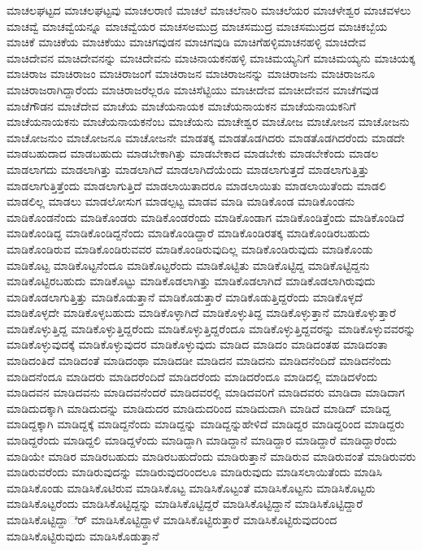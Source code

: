 {ಮಾಚಲಘಟ್ಟದ
ಮಾಚಲಘಟ್ಟವು
ಮಾಚಲರಾಣಿ
ಮಾಚಲೆ
ಮಾಚಲೆನಾರಿ
ಮಾಚಲೆಯರ
ಮಾಚಳೇಶ್ವರ
ಮಾಚವಳಲು
ಮಾಚವ್ವೆ
ಮಾಚವ್ವೆಯನ್ನೂ
ಮಾಚವ್ವೆಯರ
ಮಾಚಸಅಮುದ್ರ
ಮಾಚಸಮುದ್ರ
ಮಾಚಸಮುದ್ರದ
ಮಾಚಿಕಬ್ಬೆಯ
ಮಾಚಿಕೆ
ಮಾಚಿಕೆಯ
ಮಾಚಿಕೆಯು
ಮಾಚಿಗವುಡನ
ಮಾಚಿಗವುಡಿ
ಮಾಚಿಗೆಹಳ್ಳಿಮಾಚನಹಳ್ಳಿ
ಮಾಚಿದೇವ
ಮಾಚಿದೇವನ
ಮಾಚಿದೇವನನ್ನು
ಮಾಚಿದೇವನು
ಮಾಚಿನಾಯಕನಹಳ್ಳಿ
ಮಾಚಿಮಯ್ಯನಿಗೆ
ಮಾಚಿಮಯ್ಯನು
ಮಾಚಿಯಕ್ಕ
ಮಾಚಿರಾಜ
ಮಾಚಿರಾಜಂ
ಮಾಚಿರಾಜಂಗೆ
ಮಾಚಿರಾಜನ
ಮಾಚಿರಾಜನನ್ನು
ಮಾಚಿರಾಜನು
ಮಾಚಿರಾಜನೂ
ಮಾಚಿರಾಜರಾಗಿದ್ದಾರೆಂದು
ಮಾಚಿರಾಜರೆಲ್ಲರೂ
ಮಾಚಿಸೆಟ್ಟಿಯು
ಮಾಚೀದೇವ
ಮಾಚೀದೇವನ
ಮಾಚೆಗವುಡ
ಮಾಚೆಗೌಡನ
ಮಾಚೆದೇವ
ಮಾಚೆಯ
ಮಾಚೆಯನಾಯಕ
ಮಾಚೆಯನಾಯಕನ
ಮಾಚೆಯನಾಯಕನಿಗೆ
ಮಾಚೆಯನಾಯಕನು
ಮಾಚೆಯನಾಯಕನೆಂಬ
ಮಾಚೆಯನು
ಮಾಚೇಶ್ವರ
ಮಾಚೋಜ
ಮಾಚೋಜನ
ಮಾಚೋಜನು
ಮಾಚೋಜನುಂ
ಮಾಚೋಜನೂ
ಮಾಚೋಜನೇ
ಮಾಡತಕ್ಕ
ಮಾಡತೊಡಗಿದರು
ಮಾಡತೊಡಗಿದರೆಂದು
ಮಾಡದೇ
ಮಾಡಬಹುದಾದ
ಮಾಡಬಹುದು
ಮಾಡಬೇಕಾಗಿತ್ತು
ಮಾಡಬೇಕಾದ
ಮಾಡಬೇಕು
ಮಾಡಬೇಕೆಂದು
ಮಾಡಲ
ಮಾಡಲಾಗದು
ಮಾಡಲಾಗಿತ್ತು
ಮಾಡಲಾಗಿದೆ
ಮಾಡಲಾಗಿದೆಯೆಂದು
ಮಾಡಲಾಗುತ್ತದೆ
ಮಾಡಲಾಗುತ್ತಿತ್ತು
ಮಾಡಲಾಗುತ್ತಿತ್ತೆಂದು
ಮಾಡಲಾಗುತ್ತಿದೆ
ಮಾಡಲಾಯಿತಾದರೂ
ಮಾಡಲಾಯಿತು
ಮಾಡಲಾಯಿತೆಂದು
ಮಾಡಲಿ
ಮಾಡಲಿಲ್ಲ
ಮಾಡಲು
ಮಾಡಲೋಸುಗ
ಮಾಡಲ್ಪಟ್ಟ
ಮಾಡವ
ಮಾಡಿ
ಮಾಡಿಕೊಂಡ
ಮಾಡಿಕೊಂಡನು
ಮಾಡಿಕೊಂಡನೆಂದು
ಮಾಡಿಕೊಂಡರು
ಮಾಡಿಕೊಂಡರೆಂದು
ಮಾಡಿಕೊಂಡಾಗ
ಮಾಡಿಕೊಂಡಿತ್ತೆಂದು
ಮಾಡಿಕೊಂಡಿದೆ
ಮಾಡಿಕೊಂಡಿದ್ದ
ಮಾಡಿಕೊಂಡಿದ್ದನೆಂದು
ಮಾಡಿಕೊಂಡಿದ್ದಾರೆ
ಮಾಡಿಕೊಂಡಿರತಕ್ಕ
ಮಾಡಿಕೊಂಡಿರಬಹುದು
ಮಾಡಿಕೊಂಡಿರುವ
ಮಾಡಿಕೊಂಡಿರುವವರ
ಮಾಡಿಕೊಂಡಿರುವುದಿಲ್ಲ
ಮಾಡಿಕೊಂಡಿರುವುದು
ಮಾಡಿಕೊಂಡು
ಮಾಡಿಕೊಟ್ಟ
ಮಾಡಿಕೊಟ್ಟನೆಂದೂ
ಮಾಡಿಕೊಟ್ಟರೆಂದು
ಮಾಡಿಕೊಟ್ಟಿತು
ಮಾಡಿಕೊಟ್ಟಿದ್ದ
ಮಾಡಿಕೊಟ್ಟಿದ್ದನು
ಮಾಡಿಕೊಟ್ಟಿರಬಹುದು
ಮಾಡಿಕೊಟ್ಟು
ಮಾಡಿಕೊಡಲಾಗಿತ್ತು
ಮಾಡಿಕೊಡಲಾಗಿದೆ
ಮಾಡಿಕೊಡಲಾಗಿರುವುದು
ಮಾಡಿಕೊಡಲಾಗುತ್ತಿತ್ತು
ಮಾಡಿಕೊಡುತ್ತಾನೆ
ಮಾಡಿಕೊಡುತ್ತಾರೆ
ಮಾಡಿಕೊಡುತ್ತಿದ್ದರೆಂದು
ಮಾಡಿಕೊಳ್ಳದೆ
ಮಾಡಿಕೊಳ್ಳದೇ
ಮಾಡಿಕೊಳ್ಳಬಹುದು
ಮಾಡಿಕೊಳ್ಳಾಗಿದೆ
ಮಾಡಿಕೊಳ್ಳುತಿದ್ದ
ಮಾಡಿಕೊಳ್ಳುತ್ತಾನೆ
ಮಾಡಿಕೊಳ್ಳುತ್ತಾರೆ
ಮಾಡಿಕೊಳ್ಳುತ್ತಿದ್ದ
ಮಾಡಿಕೊಳ್ಳುತ್ತಿದ್ದರೆಂದು
ಮಾಡಿಕೊಳ್ಳುತ್ತಿದ್ದರೆಂದೂ
ಮಾಡಿಕೊಳ್ಳುತ್ತಿದ್ದವರನ್ನು
ಮಾಡಿಕೊಳ್ಳುವವರನ್ನು
ಮಾಡಿಕೊಳ್ಳುವುದಕ್ಕೆ
ಮಾಡಿಕೊಳ್ಳುವುದರ
ಮಾಡಿಕೊಳ್ಳುವುದು
ಮಾಡಿದ
ಮಾಡಿದಂ
ಮಾಡಿದಂತಹ
ಮಾಡಿದಂತಾ
ಮಾಡಿದಂತಿದೆ
ಮಾಡಿದಂತೆ
ಮಾಡಿದಂಥಾ
ಮಾಡಿದಡೀ
ಮಾಡಿದನ
ಮಾಡಿದನು
ಮಾಡಿದನೆಂದಿದೆ
ಮಾಡಿದನೆಂದು
ಮಾಡಿದನೆಂದೂ
ಮಾಡಿದರು
ಮಾಡಿದರೆಂದಿದೆ
ಮಾಡಿದರೆಂದು
ಮಾಡಿದರೆಂದೂ
ಮಾಡಿದಲ್ಲಿ
ಮಾಡಿದಳೆಂದು
ಮಾಡಿದವನ
ಮಾಡಿದವನು
ಮಾಡಿದವನೆಂದರೆ
ಮಾಡಿದವರಲ್ಲಿ
ಮಾಡಿದವರಿಗೆ
ಮಾಡಿದವರು
ಮಾಡಿದಾ
ಮಾಡಿದಾಗ
ಮಾಡಿದುದಕ್ಕಾಗಿ
ಮಾಡಿದುದನ್ನು
ಮಾಡಿದುದರ
ಮಾಡಿದುದರಿಂದ
ಮಾಡಿದುದಾಗಿ
ಮಾಡಿದೆ
ಮಾಡಿದ್
ಮಾಡಿದ್ದ
ಮಾಡಿದ್ದಕ್ಕಾಗಿ
ಮಾಡಿದ್ದಕ್ಕೆ
ಮಾಡಿದ್ದನೆಂದು
ಮಾಡಿದ್ದನ್ನು
ಮಾಡಿದ್ದನ್ನುಹೇಳಿದೆ
ಮಾಡಿದ್ದರ
ಮಾಡಿದ್ದರಿಂದ
ಮಾಡಿದ್ದರು
ಮಾಡಿದ್ದರೆಂದು
ಮಾಡಿದ್ದಲಿ
ಮಾಡಿದ್ದಳೆಂದು
ಮಾಡಿದ್ದಾಗಿ
ಮಾಡಿದ್ದಾನೆ
ಮಾಡಿದ್ದಾರ
ಮಾಡಿದ್ದಾರೆ
ಮಾಡಿದ್ದಾರೆಂದು
ಮಾಡಿಯೇ
ಮಾಡಿರ
ಮಾಡಿರಬಹುದು
ಮಾಡಿರಬಹುದೆಂದು
ಮಾಡಿರುತ್ತಾನೆ
ಮಾಡಿರುವ
ಮಾಡಿರುವಂತೆ
ಮಾಡಿರುವರು
ಮಾಡಿರುವರೆಂದು
ಮಾಡಿರುವುದನ್ನು
ಮಾಡಿರುವುದರಿಂದಲೂ
ಮಾಡಿರುವುದು
ಮಾಡಿಸಲಾಯಿತೆಂದು
ಮಾಡಿಸಿ
ಮಾಡಿಸಿಕೊಂಡು
ಮಾಡಿಸಿಕೊಟಿರುವ
ಮಾಡಿಸಿಕೊಟ್ಟ
ಮಾಡಿಸಿಕೊಟ್ಟಂತೆ
ಮಾಡಿಸಿಕೊಟ್ಟನು
ಮಾಡಿಸಿಕೊಟ್ಟರು
ಮಾಡಿಸಿಕೊಟ್ಟರೆಂದು
ಮಾಡಿಸಿಕೊಟ್ಟಿದ್ದನ್ನು
ಮಾಡಿಸಿಕೊಟ್ಟಿದ್ದರೆ
ಮಾಡಿಸಿಕೊಟ್ಟಿದ್ದಾನೆ
ಮಾಡಿಸಿಕೊಟ್ಟಿದ್ದಾರೆ
ಮಾಡಿಸಿಕೊಟ್ಟಿದ್ದಾರ್ೆ
ಮಾಡಿಸಿಕೊಟ್ಟಿದ್ದಾಳೆ
ಮಾಡಿಸಿಕೊಟ್ಟಿರುತ್ತಾರೆ
ಮಾಡಿಸಿಕೊಟ್ಟಿರುವುದರಿಂದ
ಮಾಡಿಸಿಕೊಟ್ಟಿರುವುದು
ಮಾಡಿಸಿಕೊಡುತ್ತಾನೆ
}

